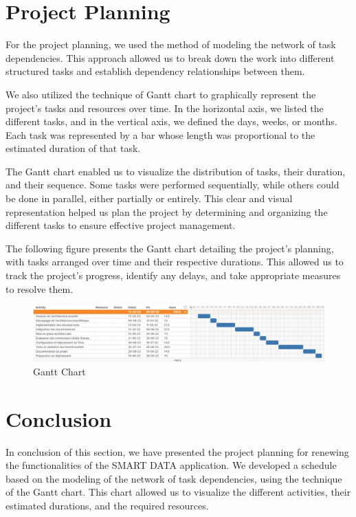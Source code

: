 \section{Project Planning}
For the project planning, we used the method of modeling the network of task dependencies. This approach allowed us to break down the work into different structured tasks and establish dependency relationships between them.

We also utilized the technique of Gantt chart to graphically represent the project's tasks and resources over time. In the horizontal axis, we listed the different tasks, and in the vertical axis, we defined the days, weeks, or months. Each task was represented by a bar whose length was proportional to the estimated duration of that task.

The Gantt chart enabled us to visualize the distribution of tasks, their duration, and their sequence. Some tasks were performed sequentially, while others could be done in parallel, either partially or entirely. This clear and visual representation helped us plan the project by determining and organizing the different tasks to ensure effective project management.

The following figure presents the Gantt chart detailing the project's planning, with tasks arranged over time and their respective durations. This allowed us to track the project's progress, identify any delays, and take appropriate measures to resolve them.

\begin{figure}[H]
\centering
\includegraphics[width=\linewidth]{images/gantt.png}
\caption{Gantt Chart}\label{fig:gantt}
\end{figure}

\section*{Conclusion}

In conclusion of this section, we have presented the project planning for renewing the functionalities of the SMART DATA application. We developed a schedule based on the modeling of the network of task dependencies, using the technique of the Gantt chart. This chart allowed us to visualize the different activities, their estimated durations, and the required resources.

